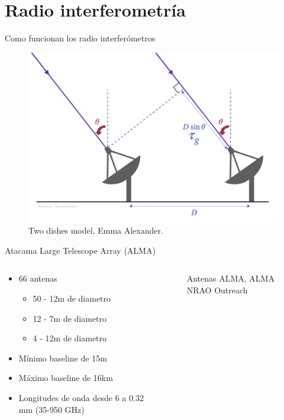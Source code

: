\documentclass[xetex,aspectratio=169]{beamer}
\begin{document}
	\section{Radio interferometría}
	
	\begin{frame}{Como funcionan los radio interferómetros}
		\begin{figure}
			\includegraphics[width=\textwidth, height=.8\textheight, keepaspectratio]{./figures/interferometry/inter_dishes.png}
			\caption{Two dishes model, Emma Alexander.}
		\end{figure}
	\end{frame}
	
    
    \begin{frame}{Atacama Large Telescope Array (ALMA)}
    	\begin{columns}
    		\begin{column}{0.48\textwidth}
    			\begin{itemize}
    				\item 66 antenas
    				\begin{itemize}
    					\item 50 - 12m de diametro
    					\item 12 - 7m de diametro
    					\item 4 - 12m de diametro
    				\end{itemize}
    				\item Mínimo baseline de 15m
    				\item Máximo baseline de 16km
    				\item Longitudes de onda desde 6 a 0.32 mm (35-950 GHz)
    			\end{itemize}
    		\end{column}
    		\begin{column}{0.48\textwidth}
    			\begin{figure}
    				\centering		
    				\caption*{Antenas ALMA, ALMA NRAO Outreach}
    		\end{figure}
    		\end{column}
    	\end{columns}
    \end{frame}
\end{document}
